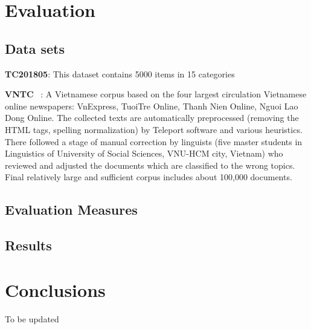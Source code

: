 \documentclass[11pt,a4paper]{article}
\begin{document}
\section{Evaluation}

\subsection{Data sets}

\noindent \textbf{TC201805}: This dataset contains 5000 items in 15 categories

\noindent \textbf{VNTC} ~\cite{DBLP:conf/rivf/HoangDNN07}: A Vietnamese corpus based on the four largest
circulation Vietnamese online newspapers: VnExpress, TuoiTre Online, Thanh Nien Online, Nguoi Lao Dong Online. The collected texts are automatically preprocessed (removing the HTML tags, spelling normalization) by Teleport software and various heuristics. There followed a stage of manual correction by linguists (five master students in Linguistics of University of Social Sciences, VNU-HCM city, Vietnam) who reviewed and adjusted the documents which are
classified to the wrong topics. Final relatively large and sufficient corpus includes about 100,000 documents.

\subsection{Evaluation Measures}

\subsection{Results}


\section{Conclusions}

To be updated



\end{document}
